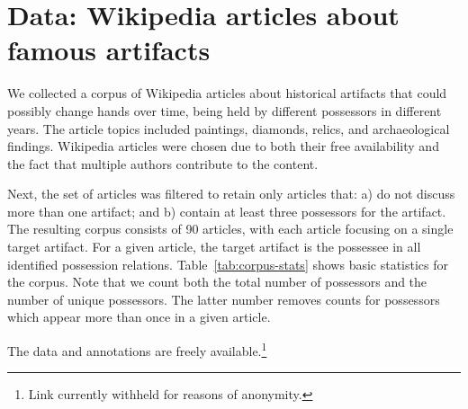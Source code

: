 \section{Data: Wikipedia articles about famous artifacts}
\label{sec:data}


We collected a corpus of Wikipedia articles about historical artifacts that could possibly change hands over time, being held by different possessors in different years. 
The article topics included paintings, diamonds, relics, and archaeological findings.
Wikipedia articles were chosen due to both their free availability and the fact that multiple authors contribute to the content. 

Next, the set of articles was filtered to retain only articles that: a) do not discuss more than one artifact; and b) contain at least three possessors for the artifact.
The resulting corpus consists of 90 articles, with each article focusing on a single target artifact. 
For a given article, the target artifact is the possessee in all identified possession relations.
Table~\ref{tab:corpus-stats} shows basic statistics for the corpus. Note that we count both the total number of possessors and the number of unique possessors. The latter number removes counts for possessors which appear more than once in a given article.

The data and annotations are freely available.\footnote{Link currently withheld for reasons of anonymity.}
